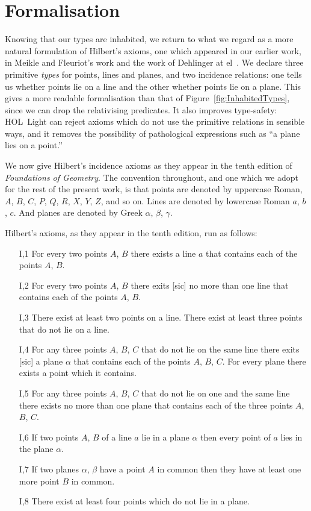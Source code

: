 \section{Formalisation}
Knowing that our types are inhabited, we return to what we regard as a more natural formulation of Hilbert's axioms, one which appeared in our earlier work, in Meikle and Fleuriot's work and the work of Dehlinger at el~\cite{DehlingerFOG,MeikleFleuriotFormalizingHilbert,ScottMScThesis}. We declare three primitive \emph{types} for points, lines and planes, and two incidence relations: one tells us whether points lie on a line and the other whether points lie on a plane. This gives a more readable formalisation than that of Figure~\ref{fig:InhabitedTypes}, since we can drop the relativising predicates. It also improves type-safety: HOL~Light can reject axioms which do not use the primitive relations in sensible ways, and it removes the possibility of pathological expressions such as ``a plane lies on a point.''

We now give Hilbert's incidence axioms as they appear in the tenth edition of \emph{Foundations of Geometry}. The convention throughout, and one which we adopt for the rest of the present work, is that points are denoted by uppercase Roman, $A$, $B$, $C$, $P$, $Q$, $R$, $X$, $Y$, $Z$, and so on. Lines are denoted by lowercase Roman $a$, $b$, $c$. And planes are denoted by Greek $\alpha$, $\beta$, $\gamma$. 

Hilbert's axioms, as they appear in the tenth edition, run as follows:
\begin{enumerate}
\item[I,1] For every two points $A$, $B$ there exists a line $a$ that contains each of the points $A$, $B$.
\item[I,2] For every two points $A$, $B$ there exits [sic] no more than one line that contains each of the points $A$, $B$.
\item[I,3] There exist at least two points on a line. There exist at least three points that do not lie on a line.
\item[I,4] For any three points $A$, $B$, $C$ that do not lie on the same line there exits [sic] a plane $\alpha$ that contains each of the points $A$, $B$, $C$. For every plane there exists a point which it contains.
\item[I,5] For any three points $A$, $B$, $C$ that do not lie on one and the same line there exists no more than one plane that contains each of the three points $A$, $B$, $C$.
\item[I,6] If two points $A$, $B$ of a line $a$ lie in a plane $\alpha$ then every point of $a$ lies in the plane $\alpha$.
\item[I,7] If two planes $\alpha$, $\beta$ have a point $A$ in common then they have at least one more point $B$ in common.
\item[I,8] There exist at least four points which do not lie in a plane.
\end{enumerate}

